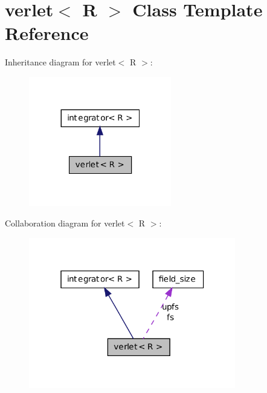 \hypertarget{classverlet}{
\section{verlet$<$ R $>$ Class Template Reference}
\label{classverlet}
}


Inheritance diagram for verlet$<$ R $>$:
\nopagebreak
\begin{figure}[H]
\begin{center}
\leavevmode
\includegraphics[width=176pt]{classverlet__inherit__graph}
\end{center}
\end{figure}


Collaboration diagram for verlet$<$ R $>$:
\nopagebreak
\begin{figure}[H]
\begin{center}
\leavevmode
\includegraphics[width=256pt]{classverlet__coll__graph}
\end{center}
\end{figure}
